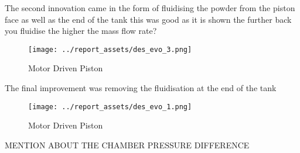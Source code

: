 The second innovation came in the form of fluidising the powder from the piston face as well as the end of the tank
this was good as it is shown the further back you fluidise the higher the mass flow rate?
\begin{figure}[htbp]
    \centering
    
    \begin{minipage}{0.9\textwidth}
        \centering
        \texttt{[image: ../report\_assets/des\_evo\_3.png]}
        \caption*{Motor Driven Piston~\cite{SUN201630}}
    \end{minipage}
   
\end{figure}

The final improvement was removing the fluidisation at the end of the tank
\begin{figure}[htbp]
    \centering
    
    \begin{minipage}{0.9\textwidth}
        \centering
        \texttt{[image: ../report\_assets/des\_evo\_1.png]}
        \caption*{Motor Driven Piston~\cite{SUN201630}}
    \end{minipage}
   
\end{figure}

MENTION ABOUT THE CHAMBER PRESSURE DIFFERENCE

\newpage
